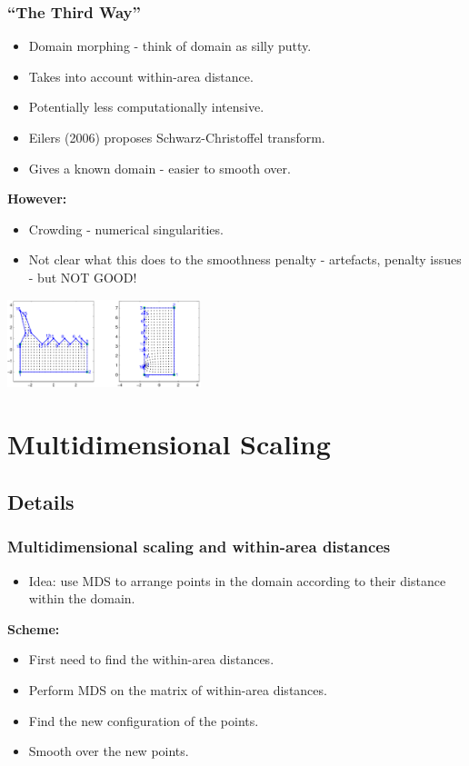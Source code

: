 \documentclass[ignorenonframetext]{beamer} %
\newcommand{\bc}{\begin{center}}
\newcommand{\ec}{\end{center}}
\newcommand{\bi}{\begin{itemize}}
\newcommand{\ei}{\end{itemize}}
\begin{document}
\begin{frame}
	\frametitle{``The Third Way''}
      \bi
         \item Domain morphing - think of domain as silly putty.
         \item Takes into account within-area distance.
         \item Potentially less computationally intensive. 
         \item Eilers (2006) proposes Schwarz-Christoffel transform.
         \item Gives a known domain - easier to smooth over.
      \ei
      \bc
         \textbf{However:}
      \ec
      \bi
         \item Crowding - numerical singularities.
         \item Not clear what this does to the smoothness penalty - artefacts, penalty issues - but NOT GOOD!
      \ei
      \bc
         \includegraphics[height=1in]{figs/matlab-test-3}
      \ec
\end{frame}



\section{Multidimensional Scaling}

\subsection{Details}

\begin{frame}
	\frametitle{Multidimensional scaling and within-area distances}
       \bi
         \item Idea: use MDS to arrange points in the domain according to their distance within the domain.
         \ei
         \bc \textbf{Scheme:} \ec
         \bi
         \item First need to find the within-area distances.
         \item Perform MDS on the matrix of within-area distances.
         \item Find the new configuration of the points.
         \item Smooth over the new points.

        \ei
\end{frame}
\end{document}

